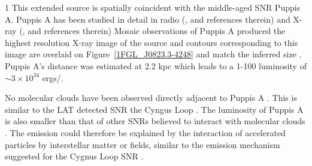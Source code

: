 \documentclass[12pt,preprint]{aastex}
\newcommand{\gev}{\text{GeV}\xspace}
\newcommand{\s}{\text{s}\xspace}
\newcommand{\rosat}{\text{{\em ROSAT}}\xspace}
\newcommand{\hl}[1]{#1}
\begin{document}
\hl{1
This extended source is spatially coincident with the middle-aged
SNR Puppis A.  Puppis A has been studied in detail in radio
(\cite{puppis_a_vla}, and references therein) and  X-ray 
(\cite{rosat_puppis_a,suzaku_puppis_a}, and references therein)
Mosaic \rosat observations of Puppis A produced the highest
resolution X-ray image of the source
and contours corresponding to this
image are overlaid on Figure~\ref{1FGL_J0823.3-4248} and match the
inferred \gev size \citep{rosat_puppis_a}.
Puppis A's distance was estimated at 2.2 kpc \citep{reynoso_1995,reynoso_2003}
which leads to a 1-100 \gev luminosity of $\sim 3\times 10^{34}$ ergs/\s.

No molecular clouds have been observed directly adjacent to Puppis A 
\citep{co_eastern_puppis_a}.
This is similar to the LAT detected SNR the Cyngus Loop \citep{cygnus_loop_lat}.
The luminosity of Puppis A is also smaller than that of 
other SNRs believed to interact with molecular clouds
\citep{w51c,ic443,w44,w28,w49b_lat}.
The \gev emission could therefore be explained by the interaction
of accelerated particles by interstellar matter or fields, similar
to the emission mechanism suggested for the Cygnus Loop SNR
\citep{cygnus_loop_lat}.
}


%
    
\end{document}
